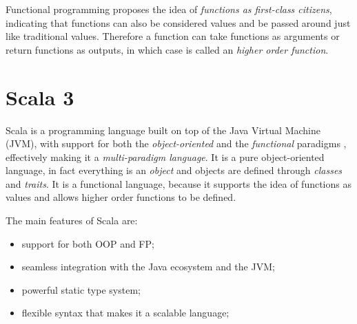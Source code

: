 Functional programming proposes the idea of \textit{functions as first-class citizens}, indicating that functions can also be considered values and be passed around just like traditional values.
%
Therefore a function can take functions as arguments or return functions as outputs, in which case is called an \textit{higher order function}.

\section{Scala 3}

Scala is a programming language built on top of the Java Virtual Machine (JVM), with support for both the \textit{object-oriented} and the \textit{functional} paradigms \cite{scala-lang-spec}, effectively making it a \textit{multi-paradigm language}.
%
It is a pure object-oriented language, in fact everything is an \textit{object} and objects are defined through \textit{classes} and \textit{traits}.
%
It is a functional language, because it supports the idea of functions as values and allows higher order functions to be defined.

The main features of Scala are:
%
\begin{itemize}
    \item support for both OOP and FP;
    \item seamless integration with the Java ecosystem and the JVM;
    \item powerful static type system;
    \item flexible syntax that makes it a scalable language;
\end{itemize}

